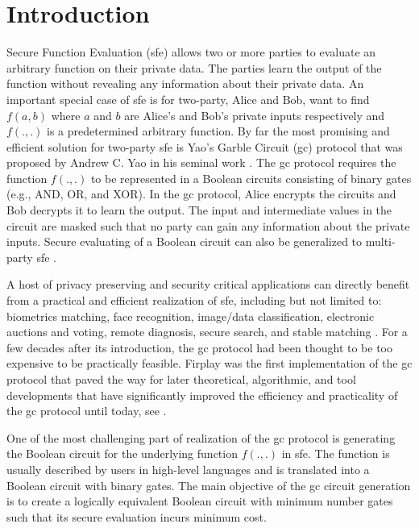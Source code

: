 \chapter{Introduction}
Secure Function Evaluation (\acrshort{sfe}) allows two or more parties to evaluate an arbitrary function on their private data.
The parties learn the output of the function without revealing any information about their private data.
An important special case of \acrshort{sfe} is for two-party, Alice and Bob, want to find $f(a, b)$ where $a$ and $b$ are Alice's and Bob's private inputs respectively and $f(., .)$ is a predetermined arbitrary function.
By far the most promising and efficient solution for two-party \acrshort{sfe} is Yao's Garble Circuit (\acrshort{gc}) protocol that was proposed by Andrew C. Yao in his seminal work \cite{yao1986generate}.
The \acrshort{gc} protocol requires the function $f(., .)$ to be represented in a Boolean circuits consisting of binary gates (e.g., AND, OR, and XOR).
In the \acrshort{gc} protocol, Alice encrypts the circuits and Bob decrypts it to learn the output.
The input and intermediate values in the circuit are masked such that no party can gain any information about the private inputs.
Secure evaluating of a Boolean circuit can also be generalized to multi-party \acrshort{sfe} \cite{goldreich1987play, ben2008fairplaymp}.

A host of privacy preserving and security critical applications can directly benefit from a practical and efficient realization of \acrshort{sfe}, including but not limited to: biometrics matching, face recognition, image/data classification, electronic auctions and voting, remote diagnosis, secure search, and stable matching \cite{riazi2017toward, zhang2016robust, bringer2013privacy, evans2011efficient, bareporni2009secure, naor1999privacy, brickell2007privacy, jha2008towards}.
For a few decades after its introduction, the \acrshort{gc} protocol had been thought to be too expensive to be practically feasible.
Firplay \cite{malkhi2004fairplay} was the first implementation of the \acrshort{gc} protocol that paved the way for later theoretical, algorithmic, and tool developments that have significantly improved the efficiency and practicality of the \acrshort{gc} protocol until today, see \cite{malkhi2004fairplay, kolesnikov2008improved, pinkas2009secure, huang2011faster, bellare2013efficient, zahur2015two, zahur2015obliv, liu2015oblivm}.

One of the most challenging part of realization of the \acrshort{gc} protocol is generating the Boolean circuit for the underlying function $f(., .)$ in \acrshort{sfe}.
The function is usually described by users in high-level languages and is translated into a Boolean circuit with binary gates.
The main objective of the \acrshort{gc} circuit generation is to create a logically equivalent Boolean circuit with minimum number gates such that its secure evaluation incurs minimum cost.

